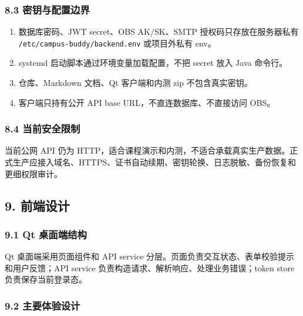 \documentclass[
]{ctexart}
\providecommand{\tightlist}{%
  \setlength{\itemsep}{0pt}\setlength{\parskip}{0pt}}
\begin{document}
\hypertarget{ux5bc6ux94a5ux4e0eux914dux7f6eux8fb9ux754c}{%
\subsubsection{8.3
密钥与配置边界}\label{ux5bc6ux94a5ux4e0eux914dux7f6eux8fb9ux754c}}

\begin{enumerate}
\def\labelenumi{\arabic{enumi}.}
\tightlist
\item
  数据库密码、JWT secret、OBS AK/SK、SMTP 授权码只存放在服务器私有
  \texttt{/etc/campus-buddy/backend.env} 或项目外私有 env。
\item
  systemd 启动脚本通过环境变量加载配置，不把 secret 放入 Java 命令行。
\item
  仓库、Markdown 文档、Qt 客户端和内测 zip 不包含真实密钥。
\item
  客户端只持有公开 API base URL，不直连数据库、不直接访问 OBS。
\end{enumerate}

\hypertarget{ux5f53ux524dux5b89ux5168ux9650ux5236}{%
\subsubsection{8.4
当前安全限制}\label{ux5f53ux524dux5b89ux5168ux9650ux5236}}

当前公网 API 仍为
HTTP，适合课程演示和内测，不适合承载真实生产数据。正式生产应接入域名、HTTPS、证书自动续期、密钥轮换、日志脱敏、备份恢复和更细权限审计。

\hypertarget{ux524dux7aefux8bbeux8ba1}{%
\subsection{9. 前端设计}\label{ux524dux7aefux8bbeux8ba1}}

\hypertarget{qt-ux684cux9762ux7aefux7ed3ux6784}{%
\subsubsection{9.1 Qt
桌面端结构}\label{qt-ux684cux9762ux7aefux7ed3ux6784}}

Qt 桌面端采用页面组件和 API service
分层。页面负责交互状态、表单校验提示和用户反馈；API service
负责构造请求、解析响应、处理业务错误；token store 负责保存当前登录态。

\hypertarget{ux4e3bux8981ux4f53ux9a8cux8bbeux8ba1}{%
\subsubsection{9.2
主要体验设计}\label{ux4e3bux8981ux4f53ux9a8cux8bbeux8ba1}}
\end{document}
